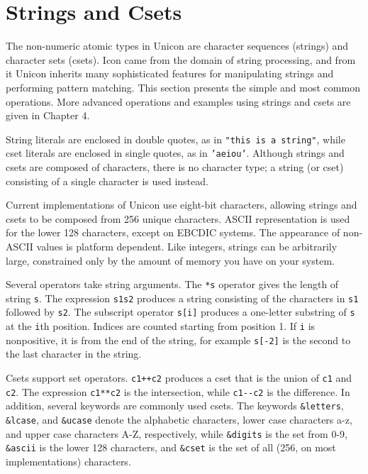 \section{Strings and Csets}

The non-numeric atomic types in Unicon are character sequences
(strings) and character sets
(csets). Icon came from the domain of string
processing, and from it Unicon inherits many sophisticated features for
manipulating strings and performing pattern
matching. This section presents the simple and most common operations.
More advanced operations and examples using strings and csets are given
in Chapter 4.

String literals are enclosed in double quotes, as
in \texttt{"this is a string"}, while
cset literals are enclosed in single quotes, as in
\texttt{'aeiou'}. Although strings
and csets are composed of characters, there is no
character type; a string (or cset) consisting of a
single character is used instead.

Current implementations of Unicon use eight-bit characters, allowing
strings and csets to be composed from 256 unique characters.
ASCII representation is used for the lower 128 characters,
except on EBCDIC systems. The appearance of non-ASCII
values is platform dependent. Like integers, strings can be arbitrarily
large, constrained only by the amount of memory you have on your
system.

Several operators take string arguments. The \texttt{*s} operator gives the length
of string \texttt{s}. The expression \texttt{s1{\textbar}{\textbar}s2} produces a
string consisting of the characters in \texttt{s1} followed by
\texttt{s2}. The subscript operator
\texttt{s[i]} produces a one-letter
substring of \texttt{s} at the \texttt{i}th position.
Indices are counted starting from
position 1. If \texttt{i} is nonpositive, it is from the end of the
string, for example \texttt{s[-2]} is the second to the last character
in the string.

Csets support set operators. \texttt{c1++c2}
produces a cset that is the union of \texttt{c1} and \texttt{c2}.
The expression \texttt{c1**c2} is the
intersection, while \texttt{c1-{}-c2} is
the difference. In addition, several keywords are commonly used
csets. The keywords \texttt{\&letters},
\texttt{\&lcase}, and \texttt{\&ucase} denote the alphabetic
characters, lower case characters a-z, and
upper case characters A-Z, respectively, while
\texttt{\&digits} is the set from 0-9,
\texttt{\&ascii} is the lower 128 characters, and
\texttt{\&cset} is the set of all (256,
on most implementations) characters.

